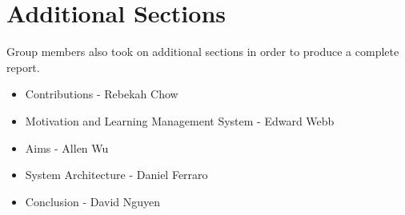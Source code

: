 \section{Additional Sections}
Group members also took on additional sections in order to produce a complete report.

\begin{itemize}
    \item Contributions - Rebekah Chow
    \item Motivation and Learning Management System - Edward Webb
    \item Aims - Allen Wu
    \item System Architecture - Daniel Ferraro
    \item Conclusion - David Nguyen
\end{itemize}
